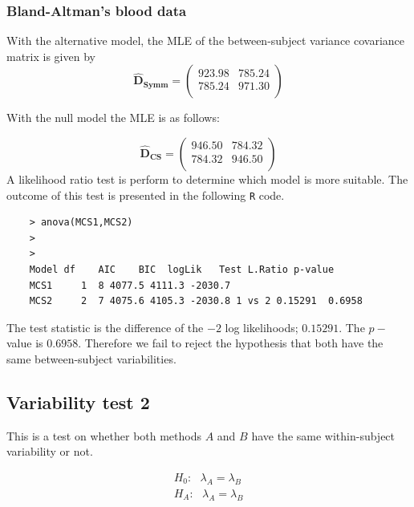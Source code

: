 \documentclass[12pt, a4paper]{report}
\theoremstyle{plain}
\theoremstyle{definition}
\theoremstyle{remark}
\begin{document}
	\subsubsection{Bland-Altman's blood data}
	With the alternative model, the MLE of the between-subject variance covariance matrix is given by
	\begin{equation}
	\boldsymbol{\hat{D}_{Symm}} = \left( \begin{array}{cc}
	923.98 & 785.24  \\
	785.24 & 971.30  \\
	\end{array}\right)
	\end{equation}
	
	With the null model the MLE is as follows:
	
	\begin{equation}
	\boldsymbol{\hat{D}_{CS}} = \left( \begin{array}{cc}
	946.50 & 784.32  \\
	784.32 & 946.50  \\
	\end{array}\right)
	\end{equation}
	A likelihood ratio test is perform to determine which model is more suitable. The outcome of this test is presented in the following \texttt{R} code.
	\begin{verbatim}
	> anova(MCS1,MCS2)
	>
	>
	Model df    AIC    BIC  logLik   Test L.Ratio p-value
	MCS1     1  8 4077.5 4111.3 -2030.7
	MCS2     2  7 4075.6 4105.3 -2030.8 1 vs 2 0.15291  0.6958
	\end{verbatim}
	
	The test statistic is the difference of the $-2$ log likelihoods; $0.15291$. The $p-$value is $0.6958$. Therefore we fail to reject the hypothesis that both have the same between-subject variabilities.
	
	\subsection{Variability test 2}
	
	This is a test on whether both methods $A$ and $B$ have the same within-subject variability or not.
	
	\begin{eqnarray}
	H_{0}: \mbox{ }\lambda_{A}  = \lambda_{B} \\
	H_{A}: \mbox{ }\lambda_{A}  = \lambda_{B}
	\end{eqnarray}
	
\end{document}

